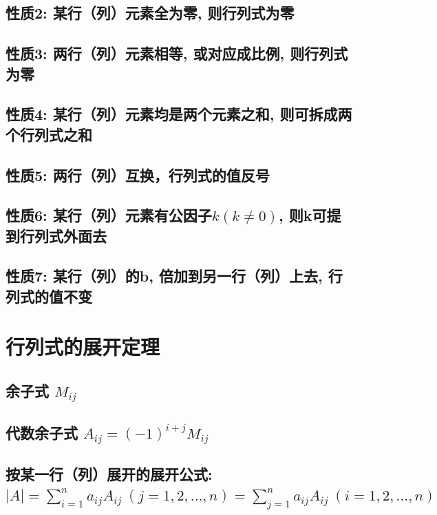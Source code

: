\documentclass[UTF8]{ctexart}
\begin{document}
	\subsection{性质2: 某行（列）元素全为零, 则行列式为零}
	
	\subsection{性质3: 两行（列）元素相等, 或对应成比例, 则行列式为零}
	
	\subsection{性质4: 某行（列）元素均是两个元素之和, 则可拆成两个行列式之和}
	
	\subsection{性质5: 两行（列）互换，行列式的值反号}
	
	\subsection{性质6: 某行（列）元素有公因子$k\left( k\ne 0 \right) $, 则k可提到行列式外面去 }
	
	\subsection{性质7: 某行（列）的b, 倍加到另一行（列）上去, 行列式的值不变 }
	
	
	\section{行列式的展开定理}
	
	\subsection{余子式 $M_{ij}$}
	
	\subsection{代数余子式 $	A_{ij}=\left( -1 \right) ^{i+j}M_{ij}$}
	
	\subsection{按某一行（列）展开的展开公式: \\ $|A|=\sum_{i=1}^n{a_{ij}A_{ij}\ \left( j=1,2,...,n \right)}=\sum_{j=1}^n{a_{ij}A_{ij}\ \left( i=1,2,...,n \right)}$	}
	
\end{document}
